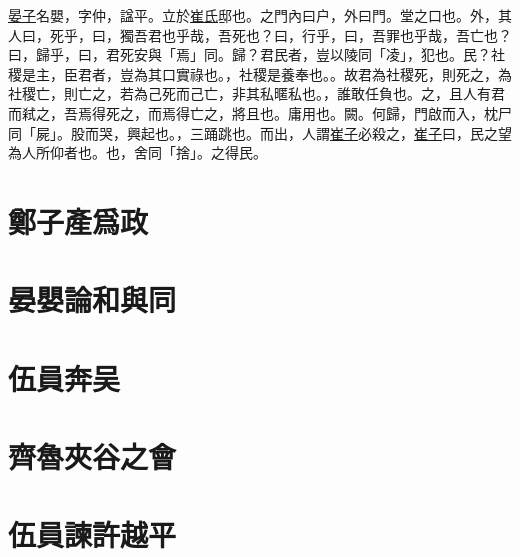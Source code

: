 \documentclass{article}
\newcommand{\tsu}{\small\kaishu\color{brown}}
\begin{document}
\uline{晏子}{\tsu 名嬰，字仲，諡平。}立於\uline{崔氏}{\tsu 邸也。}之門{\tsu 內曰户，外曰門。堂之口也。}外，其人曰，死乎，曰，獨吾君也乎哉，吾死也？曰，行乎，曰，吾罪也乎哉，吾亡也？曰，歸乎，曰，君死安{\tsu 與「焉」同。}歸？君民者，豈以陵{\tsu 同「凌」，犯也。}民？社稷是主，臣君者，豈為其口實{\tsu 祿也。}，社稷是養{\tsu 奉也。}。故君為社稷死，則死之，為社稷亡，則亡之，若為己死而己亡，非其私暱{\tsu 私也。}，誰敢任{\tsu 負也。}之，且人有君而弒之，吾焉得死之，而焉得亡之，將{\tsu 且也。}庸{\tsu 用也。闕。}何歸，門啟而入，枕尸{\tsu 同「屍」。}股而哭，興{\tsu 起也。}，三踊{\tsu 跳也。}而出，人謂\uline{崔子}必殺之，\uline{崔子}曰，民之望{\tsu 為人所仰者也。}也，舍{\tsu 同「捨」。}之得民。

\section{鄭子產爲政}

\section{晏嬰論和與同}

\section{伍員奔吴}

\section{齊魯夾谷之會}

\section{伍員諫許越平}
\end{document}
